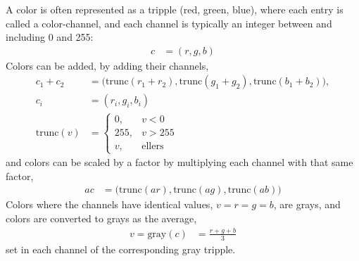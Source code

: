 A color is often represented as a tripple (red, green, blue), where
each entry is called a color-channel, and each channel is typically an
integer between and including 0 and 255:
\begin{align}
  c &= (r, g,b)
\end{align}
Colors can be added, by adding their channels,
\begin{align}
  c_1 + c_2 &= \big(\text{trunc}(r_1+r_2), \text{trunc}(g_1+g_2), \text{trunc}(b_1+b_2)\big),
  \\c_i &= (r_i, g_i,b_i)
  \\\text{trunc}(v) &=
  \begin{cases}
    0, &v < 0
    \\255, &v > 255
    \\v, &\text{ellers}
  \end{cases}
\end{align}
and colors can be scaled by a factor by multiplying each channel with
that same factor,
\begin{align}
  a c &= \big(\text{trunc}(a r), \text{trunc}(a g), \text{trunc}(a b)\big)
\end{align}
Colors where the channels have identical values, $v=r=g=b$, are grays,
and colors are converted to grays as the average,
\begin{align}
  v = \text{gray}(c) &= \frac{r+g+b}{3}
\end{align}
set in each channel of the corresponding gray tripple.